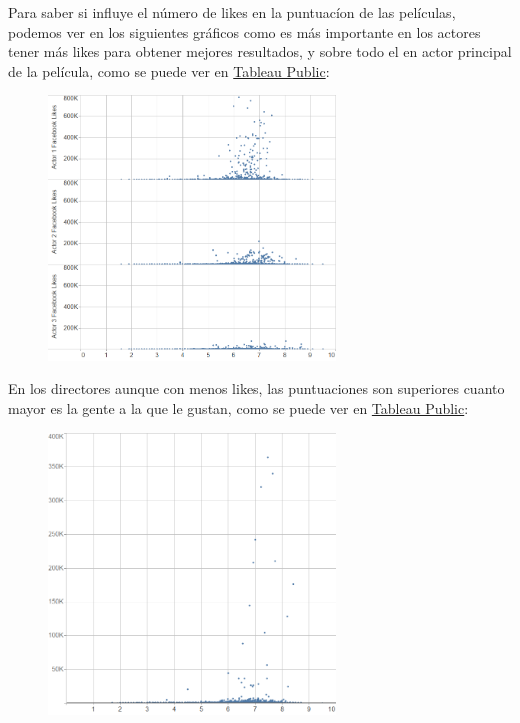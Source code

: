 \documentclass{article}
\begin{document}
\clearpage

Para saber si influye el número de likes en la puntuacíon de las películas, podemos ver en los siguientes gráficos como es más importante en los actores tener más likes para obtener mejores resultados, y sobre todo el en actor principal de la película, como se puede ver en \href{https://public.tableau.com/profile/javier6580\#!/vizhome/proyecto_fin_de_master_dataset/likes_actors_rating}{Tableau Public}:

\begin{figure}[h]
\centering
\includegraphics[width=3in,clip,keepaspectratio]{./images_latex/likes_actors_rating}
\end{figure}

En los directores aunque con menos likes, las puntuaciones son superiores cuanto mayor es la gente a la que le gustan, como se puede ver en \href{https://public.tableau.com/profile/javier6580\#!/vizhome/proyecto_fin_de_master_dataset/likes_director_rating}{Tableau Public}:

\begin{figure}[h]
\centering
\includegraphics[width=3in,clip,keepaspectratio]{./images_latex/likes_director_rating}
\end{figure}
\end{document}
